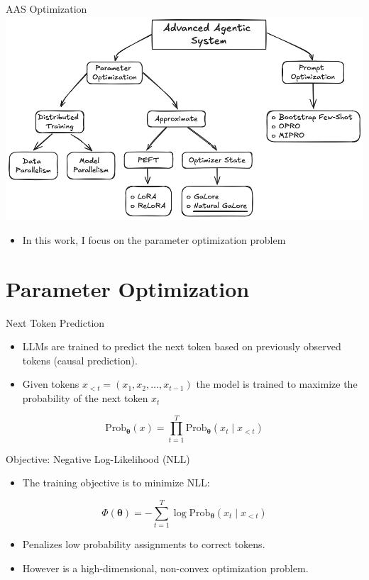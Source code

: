 \documentclass{beamer}
\begin{document}
\begin{frame}{AAS Optimization}
    \includegraphics[width=\textwidth]{figures/AAS Optimization.png}
    \begin{itemize}
        \item In this work, I focus on the parameter optimization problem
    \end{itemize}
\end{frame}

\section{Parameter Optimization}

\begin{frame}{Next Token Prediction}
    \begin{itemize}
        \item LLMs are trained to predict the next token based on previously observed tokens (causal prediction).
        \item Given tokens \( x_{<t} = (x_1, x_2, \dots, x_{t-1}) \) the model is trained to maximize the probability of the next token \( x_t \)
    \end{itemize}
    \begin{equation}
        \text{Prob}_{\mathbf{\theta}}(x) = \prod_{t=1}^{T} \text{Prob}_{\mathbf{\theta}}(x_t \mid x_{<t})
    \end{equation}
\end{frame}

\begin{frame}{Objective: Negative Log-Likelihood (NLL)}
    \begin{itemize}
        \item The training objective is to minimize NLL:
    \end{itemize}
    \begin{equation}
        \Phi(\mathbf{\theta}) = -\sum_{t=1}^{T} \log \text{Prob}_{\mathbf{\theta}}(x_t \mid x_{<t})
        \label{eq:cross_entropy_loss}
    \end{equation}
    \begin{itemize}
        \item Penalizes low probability assignments to correct tokens.
        \item However is a high-dimensional, non-convex optimization problem.
    \end{itemize}
\end{frame}
\end{document}
